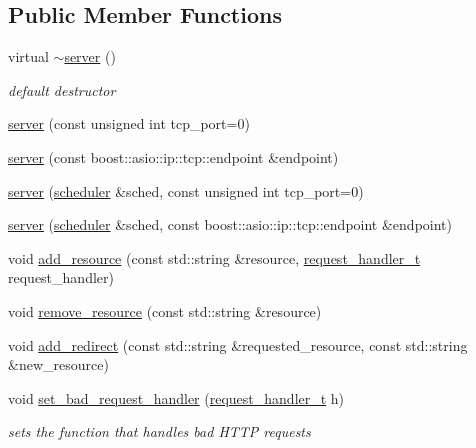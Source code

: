 \subsection*{Public Member Functions}
\begin{DoxyCompactItemize}
\item 
virtual \hyperlink{classpion_1_1http_1_1server_a5632ccba73177582414d649c6316362d}{$\sim$server} ()
\begin{DoxyCompactList}\small\item\em default destructor \end{DoxyCompactList}\item 
\hyperlink{classpion_1_1http_1_1server_a12ed7b808ae35c5e503f9d23d73860d7}{server} (const unsigned int tcp\-\_\-port=0)
\item 
\hyperlink{classpion_1_1http_1_1server_ac63e91762958da5d8122a1be80650382}{server} (const boost\-::asio\-::ip\-::tcp\-::endpoint \&endpoint)
\item 
\hyperlink{classpion_1_1http_1_1server_abdfcbc45db2b886e3bfcf0c6b867b0c2}{server} (\hyperlink{classpion_1_1scheduler}{scheduler} \&sched, const unsigned int tcp\-\_\-port=0)
\item 
\hyperlink{classpion_1_1http_1_1server_ae84f4442d8bd468a1d77a1c96e29e681}{server} (\hyperlink{classpion_1_1scheduler}{scheduler} \&sched, const boost\-::asio\-::ip\-::tcp\-::endpoint \&endpoint)
\item 
void \hyperlink{classpion_1_1http_1_1server_a312ad564b529bda2b4ddd12f02fd6d62}{add\-\_\-resource} (const std\-::string \&resource, \hyperlink{classpion_1_1http_1_1server_a9a5ae02baccb5646a5a76b99dc44df6e}{request\-\_\-handler\-\_\-t} request\-\_\-handler)
\item 
void \hyperlink{classpion_1_1http_1_1server_ac75fe5968f4d5e5c68e6328d483d0794}{remove\-\_\-resource} (const std\-::string \&resource)
\item 
void \hyperlink{classpion_1_1http_1_1server_a114c86a620ac425e4da9ebacebda3f21}{add\-\_\-redirect} (const std\-::string \&requested\-\_\-resource, const std\-::string \&new\-\_\-resource)
\item 
void \hyperlink{classpion_1_1http_1_1server_ae519fa972938c911f02b0ec156615a0d}{set\-\_\-bad\-\_\-request\-\_\-handler} (\hyperlink{classpion_1_1http_1_1server_a9a5ae02baccb5646a5a76b99dc44df6e}{request\-\_\-handler\-\_\-t} h)
\begin{DoxyCompactList}\small\item\em sets the function that handles bad H\-T\-T\-P requests \end{DoxyCompactList}\item 

\end{DoxyCompactItemize}

